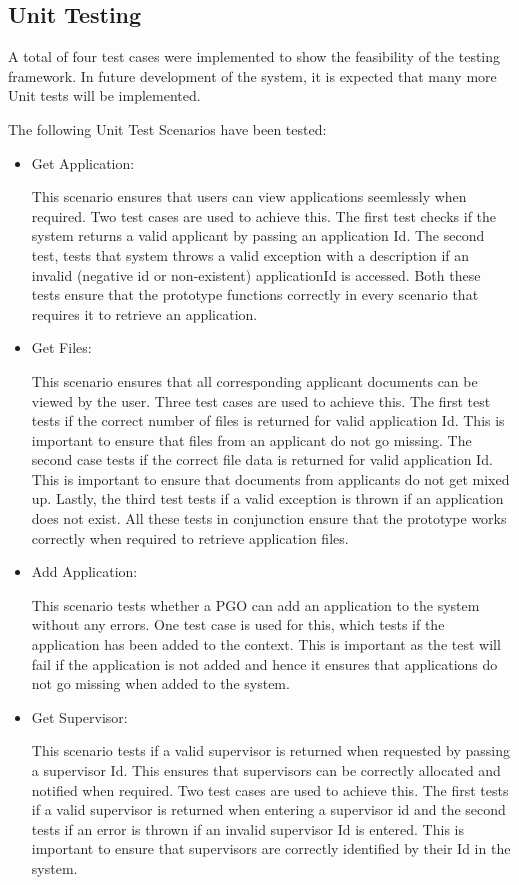 \documentclass[11pt]{article}
\begin{document}
\subsection{Unit Testing}
A total of four test cases were implemented to show the feasibility of the testing framework. In future development of the system, it is expected that many more Unit tests will be implemented.

The following Unit Test Scenarios have been tested:

\begin{itemize}
\item Get Application:

This scenario ensures that users can view applications seemlessly when required. Two test cases are used to achieve this. The first test checks if the system returns a valid applicant by passing an application Id. The second test, tests that system throws a valid exception with a description if an invalid (negative id or non-existent) applicationId is accessed. Both these tests ensure that the prototype functions correctly in every scenario that requires it to retrieve an application.


\item Get Files:

This scenario ensures that all corresponding applicant documents can be viewed by the user. Three test cases are used to achieve this. The first test tests if the correct number of files is returned for valid application Id. This is important to ensure that files from an applicant do not go missing. The second case tests if the correct file data is returned for valid application Id. This is important to ensure that documents from applicants do not get mixed up. Lastly, the third test tests if a valid exception is thrown if an application does not exist. All these tests in conjunction ensure that the prototype works correctly when required to retrieve application files.


\item Add Application:

This scenario tests whether a PGO can add an application to the system without any errors. One test case is used for this, which tests if the application has been added to the context. This is important as the test will fail if the application is not added and hence it ensures that applications do not go missing when added to the system.


\item Get Supervisor:

This scenario tests if a valid supervisor is returned when requested by passing a supervisor Id. This ensures that supervisors can be correctly allocated and notified when required. Two test cases are used to achieve this. The first tests if a valid supervisor is returned when entering a supervisor id and the second tests if an error is thrown if an invalid supervisor Id is entered. This is important to ensure that supervisors are correctly identified by their Id in the system.


\end{itemize}
\end{document}
